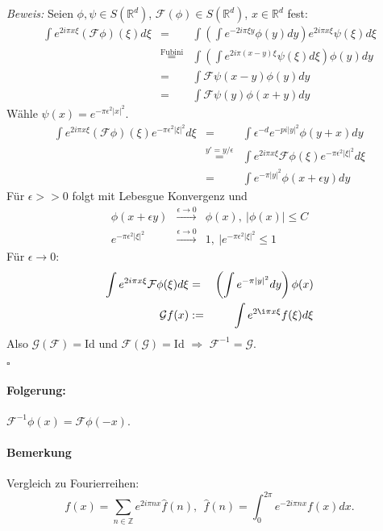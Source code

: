 \documentclass[11pt,a4paper,titlepage, ngerman]{scrartcl}
\numberwithin{equation}{section}
\newcommand{\R}{\mathbb{R}} %
\newcommand{\Z}{\mathbb{Z}} %
\newcommand{\f}{\hat{f}}
\newcommand{\F}{\mathcal{F}}
\newcommand{\G}{\mathcal{G}}
\newcommand{\Bew}{\emph{Beweis: }}
\newcommand{\qed}{\begin{flushright}
		$\square$
	\end{flushright}}
\begin{document}
	\Bew Seien $\phi,\psi\in S(\R^d)$, $\F(\phi)\in S(\R^d)$, $x\in \R^d$ fest:
	\begin{eqnarray}
		\int e^{2i\pi x\xi}(\F\phi)(\xi)d\xi &=& \int \left(\int e^{-2i\pi \xi y}\phi(y) dy\right) e^{2i\pi x\xi} \psi(\xi)d\xi\nonumber\\
		&\overset{\text{Fubini}}{=}& \int\left(\int e^{2i\pi (x-y)\xi}\psi(\xi)d\xi\right)\phi(y)dy\nonumber\\
		&=& \int\F\psi(x-y)\phi(y)dy \nonumber\\
		&=& \int \F\psi(y)\phi(x+y)dy\nonumber
	\end{eqnarray}
	Wähle $\psi(x) = e^{-\pi\epsilon^2|x|^2}$.
	\begin{eqnarray}
		\int e^{2i\pi x\xi}(\F\phi)(\xi)e^{-\pi\epsilon^2|\xi|^2}d\xi &=& \int \epsilon^{-d} e^{-pi|y|^2}\phi(y+x)dy\nonumber\\
		&\overset{y' = y/\epsilon}{=}& \int e^{2i\pi x\xi}\F\phi (\xi) e^{-\pi\epsilon^2|\xi|^2}d\xi \nonumber \\
		&=& \int e^{-\pi |y|^2}\phi (x+\epsilon y)dy\nonumber
	\end{eqnarray}
	Für $\epsilon>> 0$ folgt mit Lebesgue Konvergenz und
	\begin{eqnarray}
		\phi(x+\epsilon y)&\overset{\epsilon\rightarrow 0}{\longrightarrow}&\phi(x),~|\phi(x)|\leq C\nonumber\\
		e^{-\pi\epsilon^2|\xi|^2}&\overset{\epsilon\rightarrow 0}{\longrightarrow}& 1, ~|e^{-\pi\epsilon^2|\xi|^2}\leq 1\nonumber
	\end{eqnarray}
	Für $\epsilon\rightarrow 0$:
	\begin{eqnarray}
		\int e^{2i\pi x\xi}\F\phi(\xi)d\xi &=& \left(\int e^{-\pi|y|^2}dy \right)\phi(x)\nonumber\\
		\G f(x)&:=& \int e^{2\i\pi x\xi}f(\xi)d\xi\nonumber
	\end{eqnarray}
	Also $\G(\F) = \text{Id}$ und $\F(\G) = \text{Id}$ $\Rightarrow$ $\F^{-1} = \G$.\qed
	
	\paragraph{Folgerung:} $\F^{-1}\phi(x) = \F\phi(-x)$.
	
	\paragraph{Bemerkung} Vergleich zu Fourierreihen: 
	$$f(x)=\sum_{n\in \Z} e^{2i\pi n x}\f(n),~~ \f(n) = \int_{0}^{2\pi}e^{-2i\pi n x}f(x) dx.$$
	
\end{document}
